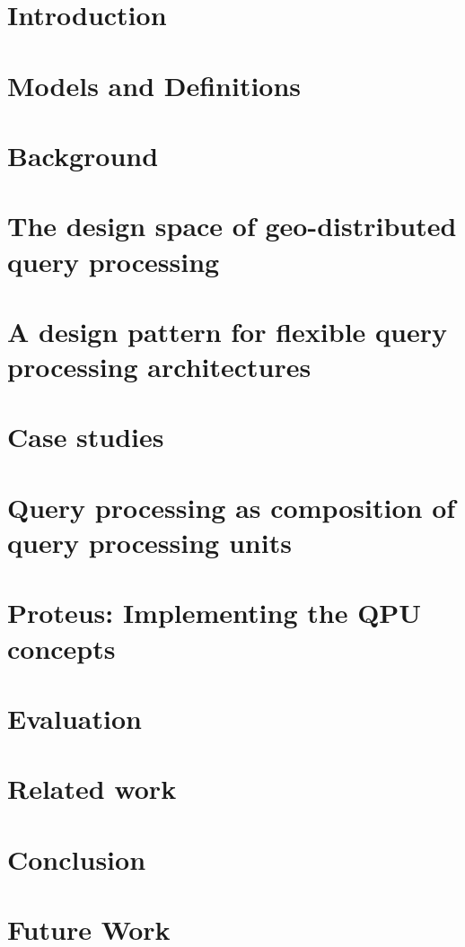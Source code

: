 \chapter{Introduction}
\label{ch:intro}


\chapter{Models and Definitions}
\label{ch:models}


\chapter{Background}
\label{ch:background}


\chapter{The design space of geo-distributed query processing}
\label{ch:design_space}


\chapter{A design pattern for flexible query processing architectures}
\label{ch:design_pattern}


\chapter{Case studies}
\label{ch:case_studies}


\chapter{Query processing as composition of query processing units}
\label{ch:composition}


\chapter{Proteus: Implementing the QPU concepts}
\label{ch:proteus}


\chapter{Evaluation}
\label{ch:evaluation}


\chapter{Related work}
\label{ch:related_work}


\chapter{Conclusion}
\label{ch:conclusion}


\chapter{Future Work}
\label{ch:future_work}

